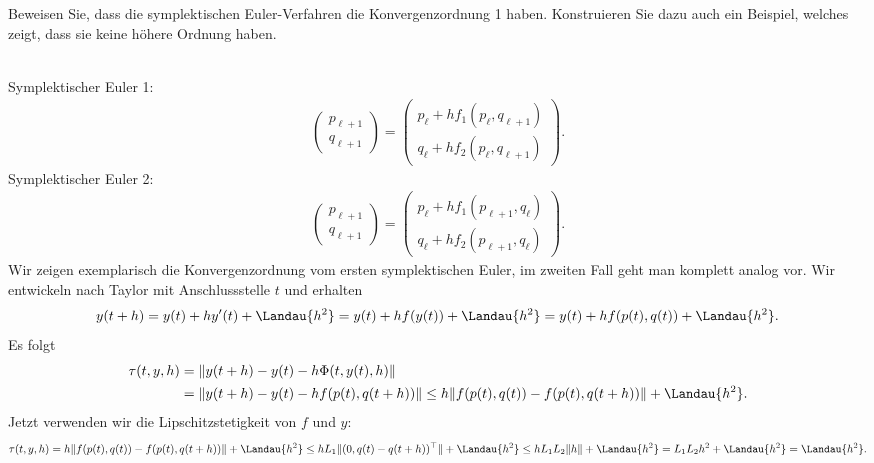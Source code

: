 \begin{exercise}
  Beweisen Sie, dass die symplektischen Euler-Verfahren die Konvergenzordnung 1
  haben. Konstruieren Sie dazu auch ein Beispiel, welches zeigt, dass sie keine
  höhere Ordnung haben.
\end{exercise}

\begin{solution}
\leavevmode \\
Symplektischer Euler 1:
\begin{align*}
  \begin{pmatrix}
    p_{\ell + 1} \\ q_{\ell + 1}
  \end{pmatrix}
  =
  \begin{pmatrix}
    p_{\ell} + hf_1(p_{\ell},q_{\ell + 1}) \\
    q_{\ell} + hf_2(p_{\ell},q_{\ell + 1})
  \end{pmatrix}.
\end{align*}
Symplektischer Euler 2:
\begin{align*}
  \begin{pmatrix}
    p_{\ell + 1} \\ q_{\ell + 1}
  \end{pmatrix}
  =
  \begin{pmatrix}
    p_{\ell} + hf_1(p_{\ell + 1},q_{\ell}) \\
    q_{\ell} + hf_2(p_{\ell + 1},q_{\ell})
  \end{pmatrix}.
\end{align*}
Wir zeigen exemplarisch die Konvergenzordnung vom ersten symplektischen
Euler, im zweiten Fall geht man komplett analog vor.
Wir entwickeln nach Taylor mit Anschlussstelle $t$ und erhalten
\begin{align*}
  y(t+h) = y(t) + hy^{\prime}(t) + \Landau{h^2} = y(t) + hf(y(t)) + \Landau{h^2} =
  y(t) + hf(p(t),q(t)) + \Landau{h^2}.
\end{align*}
Es folgt
\begin{align*}
  \tau(t,y,h) &= \|y(t+h) - y(t) - h\Phi(t,y(t),h)\| \\
   &= \|y(t+h) - y(t) - hf(p(t),q(t+h))\|
  \leq h\|f(p(t),q(t)) - f(p(t),q(t+h))\| + \Landau{h^2}.
\end{align*}
Jetzt verwenden wir die Lipschitzstetigkeit von $f$ und $y$:
\begin{align*}
  \tau(t,y,h) = h\|f(p(t),q(t)) - f(p(t),q(t+h))\| + \Landau{h^2} \leq hL_1\|(0,q(t)-q(t+h))^{\top}\| + \Landau{h^2}
  \leq hL_1L_2\|h\|+ \Landau{h^2} = L_1L_2h^2 + \Landau{h^2} = \Landau{h^2}.

\end{align*}
\end{solution}
